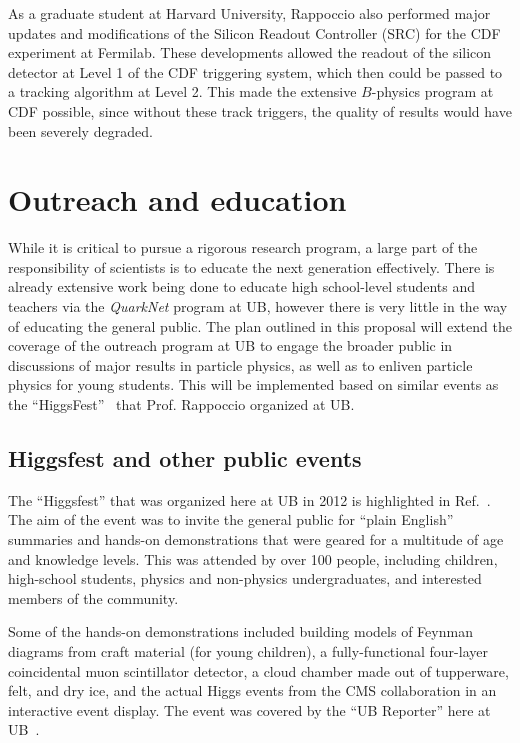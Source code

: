 \documentclass[12pt]{proposalnsf}
\begin{document}
As a graduate student at Harvard University, Rappoccio also performed
major updates and modifications of the Silicon Readout Controller
(SRC) for the CDF experiment at Fermilab. These developments allowed
the readout of the silicon detector at Level 1 of the CDF triggering
system, which then could be passed to a tracking algorithm at Level
2. This made the extensive $B$-physics program at CDF possible, since
without these track triggers, the quality of results would have been
severely degraded. 


\clearpage


\clearpage
\section{Outreach and education}
\label{sec:outreach}


While it is critical to pursue a rigorous research program, a large
part of the responsibility of scientists is to educate the next
generation effectively. There is already extensive work being done to
educate high school-level students and teachers via the {\em QuarkNet}
program  at UB, however there is
very little in the way of educating the general
public. 
The plan outlined in this proposal will extend the coverage of the
outreach program at UB to engage the broader
public in discussions of major results in particle
physics, as well as to enliven particle physics for young students. 
This will be implemented based on similar events as the
``HiggsFest''~\cite{higgsfest} that Prof. Rappoccio organized at UB. 


\subsection{Higgsfest and other public events}

The ``Higgsfest'' that was organized here at UB in 2012
is highlighted in Ref.~\cite{higgsfest}. The aim of the event was to
invite the general public for ``plain English'' summaries and hands-on
demonstrations that were geared for a multitude of age and knowledge
levels. 
This was attended by over 100 people, including children,
high-school students, physics and non-physics undergraduates, and
interested members of the community. 

Some of the hands-on demonstrations included building models of
Feynman diagrams from craft material (for young children), a
fully-functional four-layer coincidental muon scintillator detector,
a cloud chamber made out of tupperware, felt, and dry ice, and the
actual Higgs events from the CMS collaboration in an interactive event
display. 
The event was covered by the ``UB Reporter'' here at
UB~\cite{higgsfest_ubreporter}. 
\end{document}
